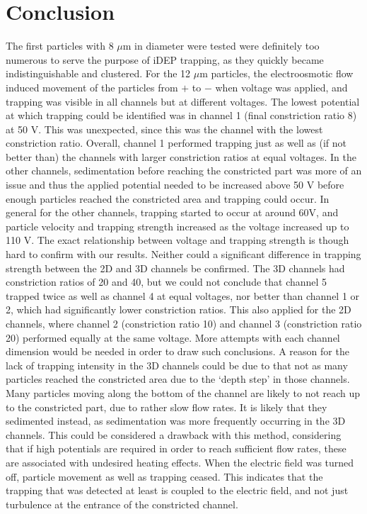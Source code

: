 \documentclass[journal, a4paper]{IEEEtran}
\begin{document}
\section{Conclusion}

The first particles with 8 $\mu$m in diameter were tested were definitely too numerous to serve the purpose of iDEP trapping, as they quickly became indistinguishable and clustered.
For the 12 $\mu$m particles, the electroosmotic flow induced movement of the particles from $+$ to $-$ when voltage was applied, and trapping was visible in all channels but at different voltages. The lowest potential at which trapping could be identified was in channel 1 (final constriction ratio 8) at 50 V. This was unexpected, since this was the channel with the lowest constriction ratio. Overall, channel 1 performed trapping just as well as (if not better than) the channels with larger constriction ratios at equal voltages.
In the other channels, sedimentation before reaching the constricted part was more of an issue and thus the applied potential needed to be increased above 50 V before enough particles reached the constricted area and trapping could occur. In general for the other channels, trapping started to occur at around 60V, and particle velocity and trapping strength increased as the voltage increased up to 110 V. The exact relationship between voltage and trapping strength is though hard to confirm with our results. Neither could a significant difference in trapping strength between the 2D and 3D channels be confirmed. The 3D channels had constriction ratios of 20 and 40, but we could not conclude that channel 5 trapped twice as well as channel 4 at equal voltages, nor better than channel 1 or 2, which had significantly lower constriction ratios. This also applied for the 2D channels, where channel 2 (constriction ratio 10) and channel 3 (constriction ratio 20) performed equally at the same voltage. More attempts with each channel dimension would be needed in order to draw such conclusions. 
A reason for the lack of trapping intensity in the 3D channels could be due to that not as many particles reached the constricted area due to the ‘depth step’ in those channels. Many particles moving along the bottom of the channel are likely to not reach up to the constricted part, due to rather slow flow rates. It is likely that they sedimented instead, as sedimentation was more frequently occurring in the 3D channels. This could be considered a drawback with this method, considering that if high potentials are required in order to reach sufficient flow rates, these are associated with undesired heating effects.  
When the electric field was turned off, particle movement as well as trapping ceased. This indicates that the trapping that was detected at least is coupled to the electric field, and not just turbulence at the entrance of the constricted channel.
\end{document}
